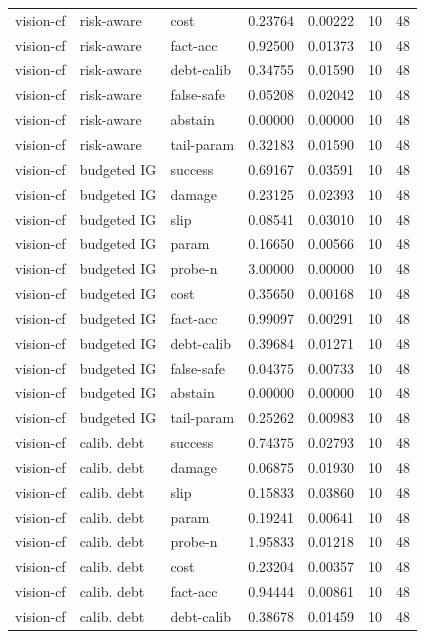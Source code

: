 \documentclass{article}
\begin{document}
\begin{center}
\begin{longtable}{lllllll}
vision-cf & risk-aware & cost & 0.23764 & 0.00222 & 10 & 48 \\
vision-cf & risk-aware & fact-acc & 0.92500 & 0.01373 & 10 & 48 \\
vision-cf & risk-aware & debt-calib & 0.34755 & 0.01590 & 10 & 48 \\
vision-cf & risk-aware & false-safe & 0.05208 & 0.02042 & 10 & 48 \\
vision-cf & risk-aware & abstain & 0.00000 & 0.00000 & 10 & 48 \\
vision-cf & risk-aware & tail-param & 0.32183 & 0.01590 & 10 & 48 \\
vision-cf & budgeted IG & success & 0.69167 & 0.03591 & 10 & 48 \\
vision-cf & budgeted IG & damage & 0.23125 & 0.02393 & 10 & 48 \\
vision-cf & budgeted IG & slip & 0.08541 & 0.03010 & 10 & 48 \\
vision-cf & budgeted IG & param & 0.16650 & 0.00566 & 10 & 48 \\
vision-cf & budgeted IG & probe-n & 3.00000 & 0.00000 & 10 & 48 \\
vision-cf & budgeted IG & cost & 0.35650 & 0.00168 & 10 & 48 \\
vision-cf & budgeted IG & fact-acc & 0.99097 & 0.00291 & 10 & 48 \\
vision-cf & budgeted IG & debt-calib & 0.39684 & 0.01271 & 10 & 48 \\
vision-cf & budgeted IG & false-safe & 0.04375 & 0.00733 & 10 & 48 \\
vision-cf & budgeted IG & abstain & 0.00000 & 0.00000 & 10 & 48 \\
vision-cf & budgeted IG & tail-param & 0.25262 & 0.00983 & 10 & 48 \\
vision-cf & calib. debt & success & 0.74375 & 0.02793 & 10 & 48 \\
vision-cf & calib. debt & damage & 0.06875 & 0.01930 & 10 & 48 \\
vision-cf & calib. debt & slip & 0.15833 & 0.03860 & 10 & 48 \\
vision-cf & calib. debt & param & 0.19241 & 0.00641 & 10 & 48 \\
vision-cf & calib. debt & probe-n & 1.95833 & 0.01218 & 10 & 48 \\
vision-cf & calib. debt & cost & 0.23204 & 0.00357 & 10 & 48 \\
vision-cf & calib. debt & fact-acc & 0.94444 & 0.00861 & 10 & 48 \\
vision-cf & calib. debt & debt-calib & 0.38678 & 0.01459 & 10 & 48 \\
\bottomrule
\end{longtable}
\renewcommand{\arraystretch}{1.0}
\end{center}
\end{document}
